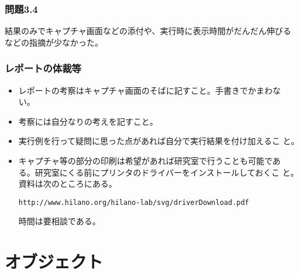 \begin{frame}[containsverbatim]
 \frametitle{問題3.4}
 結果のみでキャプチャ画面などの添付や、実行時に表示時間がだんだん伸びる
 などの指摘が少なかった。
\end{frame}
\begin{frame}[containsverbatim]
 \frametitle{レポートの体裁等}
 \begin{itemize}
  \item レポートの考察はキャプチャ画面のそばに記すこと。手書きでかまわな
        い。
  \item 考察には自分なりの考えを記すこと。
  \item 実行例を行って疑問に思った点があれば自分で実行結果を付け加えるこ
        と。
  \item キャプチャ等の部分の印刷は希望があれば研究室で行うことも可能であ
        る。研究室にくる前にプリンタのドライバーをインストールしておくこ
        と。資料は次のところにある。

        {\small
        \texttt{http://www.hilano.org/hilano-lab/svg/driverDownload.pdf}}

        時間は要相談である。
 \end{itemize}
\end{frame}
\section{オブジェクト}
